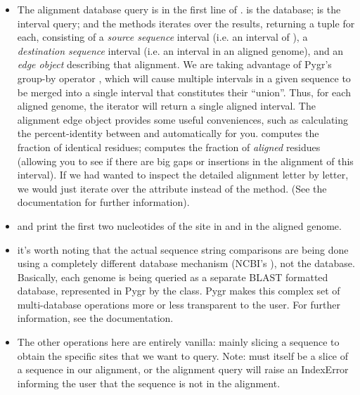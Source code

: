 \documentclass{howto}
\begin{document}
\begin{itemize}

\item
The alignment database query is in the first line of .
 is the database;  is the interval query; and the
 methods iterates over the results, returning a tuple for
each, consisting of a {\em source sequence} interval (i.e. an interval of
), a {\em destination sequence} interval (i.e. an interval in
an aligned genome), and an {\em edge object} describing that alignment.
We are taking advantage of Pygr's group-by operator ,
which will cause multiple intervals in a given sequence to be merged
into a single interval that constitutes their ``union''.  Thus,
for each aligned genome, the  iterator will return a single
aligned interval.  The alignment edge object provides some useful 
conveniences, such as calculating the percent-identity between 
and  automatically for you.   computes
the fraction of identical residues;  computes the 
fraction of {\em aligned} residues (allowing you to see if there are 
big gaps or insertions in the alignment of this interval).  If we 
had wanted to inspect the detailed alignment letter by letter, we
would just iterate over the  attribute instead of
the  method. (See the  documentation for 
further information).

\item
{} and  print the first two nucleotides
of the site in  and in the aligned genome.

\item
it's worth noting that the actual sequence string comparisons are being
done using a completely different database mechanism (NCBI's ),
not the  database.  Basically, each genome is being queried
as a separate BLAST formatted database, represented in Pygr by the
 class.  Pygr makes this complex set of multi-database
operations more or less transparent to the user.
For further information, see the  documentation.  

\item
The other operations here are entirely vanilla: mainly slicing a 
 sequence to obtain the specific sites that we want to query.
Note:  must itself be a slice of a sequence in our alignment, 
or the alignment query  will raise an IndexError informing
the user that the sequence  is not in the alignment.


\end{itemize}
\end{document}
